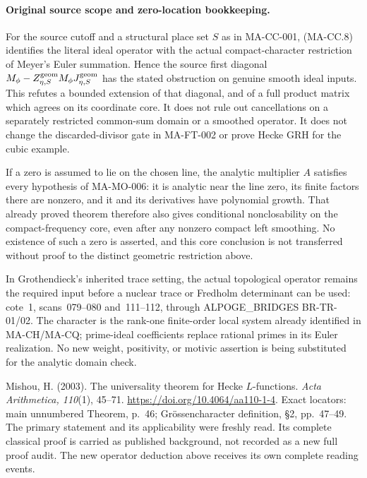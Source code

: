 \paragraph{Original source scope and zero-location bookkeeping.}
For the source cutoff and a structural place set \(S\) as in MA-CC-001,
(MA-CC.8) identifies the literal ideal operator with
the actual compact-character restriction of Meyer's
Euler summation. Hence the source first diagonal
\(M_\phi-Z_{\eta,S}^{\rm geom}M_\phi
J_{\eta,S}^{\rm geom}\) has the stated obstruction
on genuine smooth ideal inputs. This refutes a bounded
extension of that diagonal, and of a full product
matrix which agrees on its coordinate core.
It does not rule out cancellations on a separately
restricted common-sum domain or a smoothed operator.
It does not change the discarded-divisor gate in
MA-FT-002 or prove Hecke GRH for the cubic example.

If a zero is assumed to lie on the chosen line,
the analytic multiplier \(A\) satisfies every
hypothesis of MA-MO-006: it is analytic near the
line zero, its finite factors there are nonzero,
and it and its derivatives have polynomial growth.
That already proved theorem therefore also gives
conditional nonclosability on the compact-frequency
core, even after any nonzero compact left smoothing.
No existence of such a zero is asserted, and this
core conclusion is not transferred without proof
to the distinct geometric restriction above.

In Grothendieck's inherited trace setting, the
actual topological operator remains the required
input before a nuclear trace or Fredholm determinant
can be used: cote~1, scans~079--080 and~111--112,
through ALPOGE\_BRIDGES BR-TR-01/02. The character
is the rank-one finite-order local system already
identified in MA-CH/MA-CQ; prime-ideal coefficients
replace rational primes in its Euler realization.
No new weight, positivity, or motivic assertion is
being substituted for the analytic domain check.

Mishou, H. (2003). The universality theorem for Hecke
\(L\)-functions. \emph{Acta Arithmetica, 110}(1), 45--71.
\url{https://doi.org/10.4064/aa110-1-4}.
Exact locators: main unnumbered Theorem, p.~46;
Gr\"ossencharacter definition, \S2, pp.~47--49.
The primary statement and its applicability were freshly
read. Its complete classical proof is carried as
published background, not recorded as a new full proof
audit. The new operator deduction above receives its
own complete reading events.
